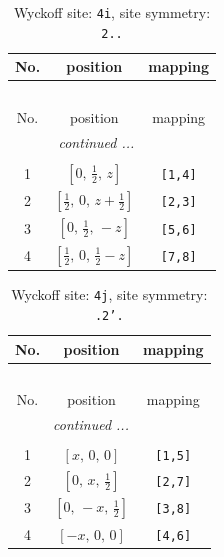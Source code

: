 \documentclass[fleqn,8pt]{jsarticle}
\begin{document}
\renewcommand{\arraystretch}{1.2}
\begin{longtable}{ccc}
\caption{Wyckoff site: {\tt 4i}, site symmetry: {\tt 2..}}
 \\
 \hline \hline
No. & position & mapping \\ \hline \endfirsthead

\multicolumn{2}{l}{\tablename\ \thetable{}} \\
 \hline \hline
No. & position & mapping \\ \hline \endhead

 \hline \hline
\multicolumn{2}{r}{\footnotesize\it continued ...} \\ \endfoot

 \hline \hline
\multicolumn{2}{r}{} \\ \endlastfoot

1 & $\left[ 0,\, \frac{1}{2},\, z \right]$ & {\tt [1,4]} \\ \hline
2 & $\left[ \frac{1}{2},\, 0,\, z + \frac{1}{2} \right]$ & {\tt [2,3]} \\ \hline
3 & $\left[ 0,\, \frac{1}{2},\, - z \right]$ & {\tt [5,6]} \\ \hline
4 & $\left[ \frac{1}{2},\, 0,\, \frac{1}{2} - z \right]$ & {\tt [7,8]} \\
\end{longtable}
\renewcommand{\arraystretch}{1.2}
\begin{longtable}{ccc}
\caption{Wyckoff site: {\tt 4j}, site symmetry: {\tt .2'.}}
 \\
 \hline \hline
No. & position & mapping \\ \hline \endfirsthead

\multicolumn{2}{l}{\tablename\ \thetable{}} \\
 \hline \hline
No. & position & mapping \\ \hline \endhead

 \hline \hline
\multicolumn{2}{r}{\footnotesize\it continued ...} \\ \endfoot

 \hline \hline
\multicolumn{2}{r}{} \\ \endlastfoot

1 & $\left[ x,\, 0,\, 0 \right]$ & {\tt [1,5]} \\ \hline
2 & $\left[ 0,\, x,\, \frac{1}{2} \right]$ & {\tt [2,7]} \\ \hline
3 & $\left[ 0,\, - x,\, \frac{1}{2} \right]$ & {\tt [3,8]} \\ \hline
4 & $\left[ - x,\, 0,\, 0 \right]$ & {\tt [4,6]} \\
\end{longtable}
\end{document}
